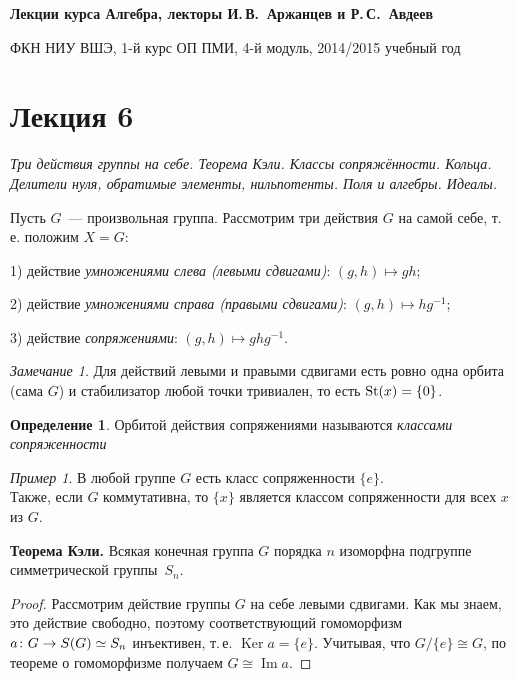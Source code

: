 \documentclass[a4paper,10pt]{amsart}
\newcommand{\Ker}{\mathop{\mathrm{Ker}}}
\renewcommand{\Im}{\mathop{\mathrm{Im}}}
\def\St{{\rm St}}%
\theoremstyle{definition}
\newtheorem{definition}{Определение}
\theoremstyle{remark}
\newtheorem{remark}{Замечание}
\newtheorem{example}{Пример}
\begin{document}
%
\sloppy
%
\centerline{\large \bf Лекции курса \guillemotleft
Алгебра\guillemotright{}, лекторы И.\,В.~Аржанцев и Р.\,С.~Авдеев}

\smallskip

\centerline{\large ФКН НИУ ВШЭ, 1-й курс ОП ПМИ, 4-й модуль,
2014/2015 учебный год}


\bigskip

\section*{Лекция 6}

\medskip

{\it Три действия группы на себе. Теорема Кэли. Классы сопряжённости.
Кольца. Делители нуля, обратимые элементы, нильпотенты. Поля и алгебры.
Идеалы. }

\medskip

Пусть $G$~--- произвольная группа. Рассмотрим три действия $G$ на
самой себе, т.\,е. положим $X=G$:

1) действие {\it умножениями слева (левыми сдвигами)}: $(g,h)\mapsto gh$;

2) действие {\it умножениями справа (правыми сдвигами)}: $(g,h)\mapsto hg^{-1}$;

3) действие {\it сопряжениями}: $(g,h)\mapsto ghg^{-1}$.

\begin{remark}
Для действий левыми и правыми сдвигами есть ровно одна орбита (сама $G$) и
стабилизатор любой точки тривиален, то есть $\St(x) = \{0\}$.
\end{remark}

\begin{definition}
Орбитой действия сопряжениями называются \textit{классами сопряженности}
\end{definition}

\begin{example}
В любой группе $G$ есть класс сопряженности $\{e\}$. \\Также, если $G$ коммутативна, то $\{x\}$ является классом сопряженности для всех $x$ из $G$.
\end{example}

\smallskip

{\bf Теорема Кэли.} Всякая конечная группа $G$ порядка $n$ изоморфна
подгруппе симметрической группы~$S_n$.

\begin{proof}
Рассмотрим действие группы $G$ на себе левыми сдвигами. Как мы
знаем, это действие свободно, поэтому соответствующий гомоморфизм $a
\colon G \to S(G) \simeq\nobreak S_n$ инъективен, т.\,е. $\Ker a =
\lbrace e \rbrace$. Учитывая, что $G / \lbrace e \rbrace \cong G$,
по теореме о гомоморфизме получаем $G \cong \Im a$.
\end{proof}
\end{document}
